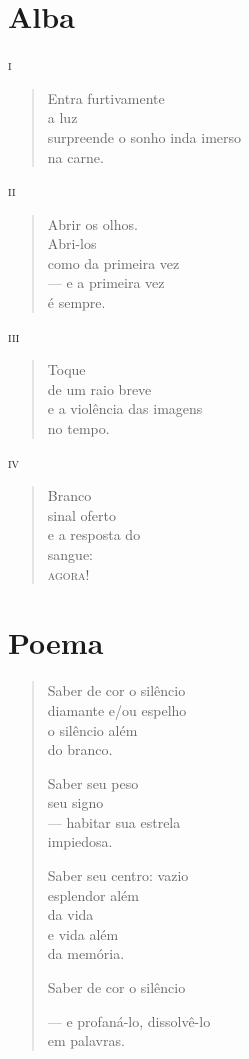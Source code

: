 \chapter{Alba}

\forceindent\textsc{i}

\begin{verse}
Entra furtivamente\\
a luz\\
surpreende o sonho inda imerso\\
\qquad\qquad\qquad\qquad\qquad na carne.
\end{verse}

\medskip
\textsc{ii}

\begin{verse}
Abrir os olhos.\\
Abri-los\\
como da primeira vez\\
--- e a primeira vez\\
\quad é sempre.
\end{verse}

\medskip
\textsc{iii}\\

\begin{verse}
Toque\\
de um raio breve\\
e a violência das imagens\\
no tempo.
\end{verse}

\medskip
\textsc{iv}

\begin{verse}
Branco\\
sinal oferto\\
e a resposta do\\
sangue:\\
\textsc{agora!}
\end{verse}


\chapter{Poema}

\begin{verse}
Saber de cor o silêncio\\
diamante e/ou espelho\\
o silêncio além\\
do branco.

Saber seu peso\\
seu signo\\
--- habitar sua estrela\\
\quad impiedosa.

Saber seu centro: vazio\\
esplendor além\\
da vida\\
e vida além\\
da memória.

Saber de cor o silêncio

--- e profaná-lo, dissolvê-lo\\
\qquad\qquad\qquad em palavras.
\end{verse}

